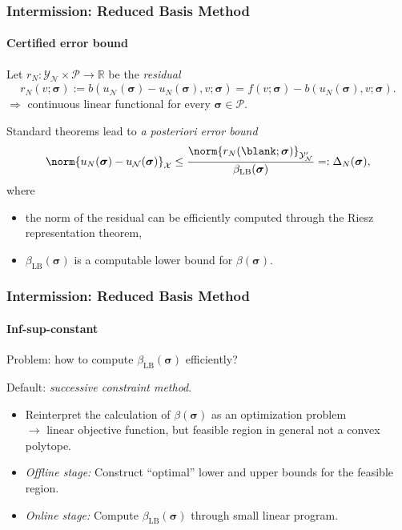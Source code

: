 \begin{frame}[t]
    \frametitle{Intermission: Reduced Basis Method}
    \framesubtitle{Certified error bound}
    Let $r_{N} \colon \mathcal Y_{\mathcal N} \times \mathcal P \to \mathbb{R}$ be the \emph{residual}
    \begin{equation}
        r_{N}(v; \bm \sigma) := b(u_{\mathcal N}(\bm \sigma) - u_{N}(\bm \sigma), v; \bm \sigma) = f(v; \bm \sigma) - b(u_{N}(\bm \sigma), v; \bm \sigma).
    \end{equation}
    $\Rightarrow$ continuous linear functional for every $\bm \sigma \in \mathcal P$.

    Standard theorems lead to \emph{a posteriori error bound}
    \begin{equation}
        \norm{u_{N}(\bm \sigma) - u_{\mathcal N}(\bm \sigma)}_{\mathcal X} \leq \frac{\norm{r_{N}(\blank; \bm \sigma)}_{\mathcal Y_{\mathcal N}'}}{\beta_{\mathrm{LB}}(\bm \sigma)} =: \Delta_{N}(\bm \sigma),
    \end{equation}
    where
    \begin{itemize}
        \item the norm of the residual can be efficiently computed through the Riesz representation theorem,
        \item $\beta_{\mathrm{LB}}(\bm \sigma)$ is a computable lower bound for $\beta(\bm \sigma)$.
    \end{itemize}
\end{frame}

\begin{frame}[t]
    \frametitle{Intermission: Reduced Basis Method}
    \framesubtitle{Inf-sup-constant}

    Problem: how to compute $\beta_{\mathrm{LB}}(\bm \sigma)$ efficiently?

    \vfill
    Default: \emph{successive constraint method}.

    \begin{itemize}
        \item Reinterpret the calculation of $\beta(\bm \sigma)$ as an optimization problem
        \\$\rightarrow$ linear objective function, but feasible region in general not a convex polytope.
        \item {}\emph{Offline stage:} Construct \enquote{optimal} lower and upper bounds for the feasible region.
        \item \emph{Online stage:} Compute $\beta_{\mathrm{LB}}(\bm \sigma)$ through small linear program.
    \end{itemize}

    \vfill
\end{frame}

